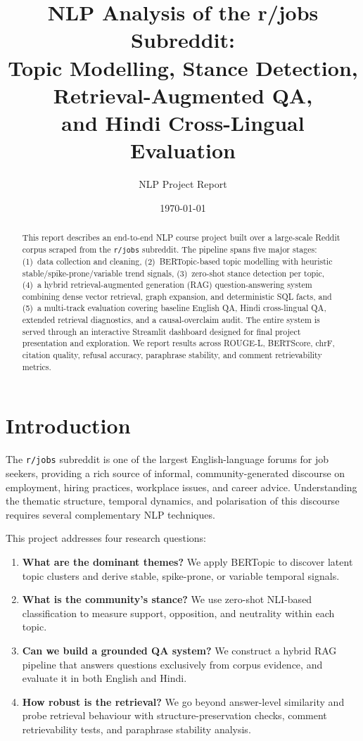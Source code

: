 \documentclass[11pt,a4paper]{article}
\title{
  \textbf{NLP Analysis of the r/jobs Subreddit:}\\[0.4em]
  \Large Topic Modelling, Stance Detection, Retrieval-Augmented QA,\\
  and Hindi Cross-Lingual Evaluation
}
\author{NLP Project Report}
\date{\today}
\begin{document}
\maketitle

\begin{abstract}
This report describes an end-to-end NLP course project built over a large-scale Reddit corpus scraped from the \texttt{r/jobs} subreddit. The pipeline spans five major stages: (1)~data collection and cleaning, (2)~BERTopic-based topic modelling with heuristic stable/spike-prone/variable trend signals, (3)~zero-shot stance detection per topic, (4)~a hybrid retrieval-augmented generation (RAG) question-answering system combining dense vector retrieval, graph expansion, and deterministic SQL facts, and (5)~a multi-track evaluation covering baseline English QA, Hindi cross-lingual QA, extended retrieval diagnostics, and a causal-overclaim audit. The entire system is served through an interactive Streamlit dashboard designed for final project presentation and exploration. We report results across ROUGE-L, BERTScore, chrF, citation quality, refusal accuracy, paraphrase stability, and comment retrievability metrics.
\end{abstract}

\tableofcontents
\newpage

\section{Introduction}
\label{sec:intro}

The \texttt{r/jobs} subreddit is one of the largest English-language forums for job seekers, providing a rich source of informal, community-generated discourse on employment, hiring practices, workplace issues, and career advice. Understanding the thematic structure, temporal dynamics, and polarisation of this discourse requires several complementary NLP techniques.

This project addresses four research questions:

\begin{enumerate}[leftmargin=*]
  \item \textbf{What are the dominant themes?} We apply BERTopic to discover latent topic clusters and derive stable, spike-prone, or variable temporal signals.
  \item \textbf{What is the community's stance?} We use zero-shot NLI-based classification to measure support, opposition, and neutrality within each topic.
  \item \textbf{Can we build a grounded QA system?} We construct a hybrid RAG pipeline that answers questions exclusively from corpus evidence, and evaluate it in both English and Hindi.
  \item \textbf{How robust is the retrieval?} We go beyond answer-level similarity and probe retrieval behaviour with structure-preservation checks, comment retrievability tests, and paraphrase stability analysis.
\end{enumerate}
\end{document}
